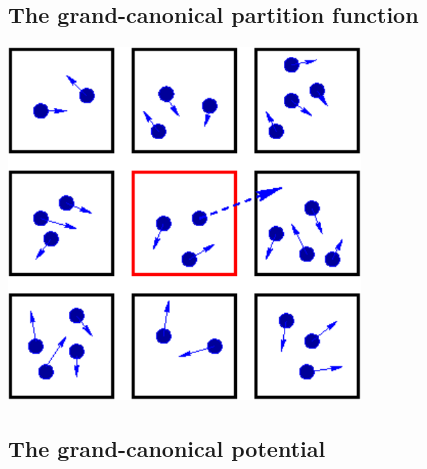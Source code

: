 \subsection{The grand-canonical partition function}


\begin{center}
  \includegraphics[width=0.7\textwidth]{figs/week06_reservoir.pdf}
\end{center}




\newpage %
\subsection{The grand-canonical potential}
